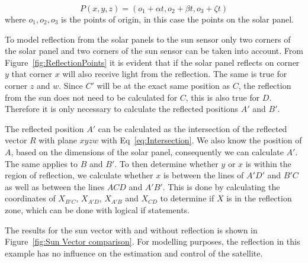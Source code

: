 \documentclass[letterpaper, 10 pt, conference]{ieeeconf}  %
\begin{document}
\begin{equation}
	P(x, y, z) = (o_1 + \alpha t, o_2 + \beta t, o_3 + \zeta t)
	\label{eq:Intersection}
\end{equation}
where $o_1, o_2, o_3$ is the points of origin, in this case the points on the solar panel.


To model reflection from the solar panels to the sun sensor only two corners of the solar panel and two corners of the sun sensor can be taken into account. From Figure~\ref{fig:ReflectionPoints} it is evident that if the solar panel reflects on corner $y$ that corner $x$ will also receive light from the reflection. The same is true for corner $z$ and $w$. Since $C'$ will be at the exact same position as $C$, the reflection from the sun does not need to be calculated for $C$, this is also true for $D$. Therefore it is only necessary to calculate the reflected positions $A'$ and $B'$.

The reflected position $A'$ can be calculated as the intersection of the reflected vector $R$ with plane $xyzw$ with Eq~\ref{eq:Intersection}. We also know the position of $A$, based on the dimensions of the solar panel, consequently we can calculate $A'$. The same applies to $B$ and $B'$. To then determine whether $y$ or $x$ is within the region of reflection, we calculate whether $x$ is between the lines of $A'D'$ and $B'C$ as well as between the lines $ACD$ and $A'B'$. This is done by calculating the coordinates of $X_{B'C}$, $X_{A'D}$, $X_{A'B}$ and $X_{CD}$ to determine if $X$ is in the reflection zone, which can be done with logical if statements.

The results for the sun vector with and without reflection is shown in Figure~\ref{fig:Sun Vector comparison}. For modelling purposes, the reflection in this example has no influence on the estimation and control of the satellite.
\end{document}
